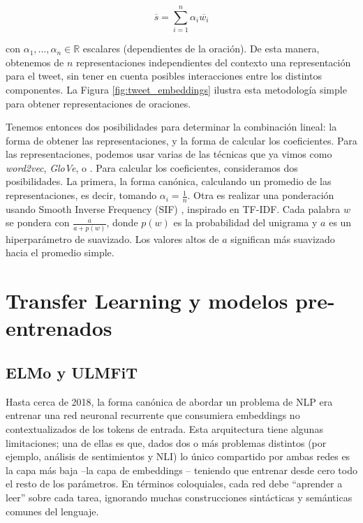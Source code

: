 \begin{equation}
    \overline{s} = \sum\limits_{i=1}^{n} \alpha_i \overline{w_i}
\end{equation}

\noindent con $\alpha_1, \ldots, \alpha_n \in \mathbb{R}$ escalares (dependientes de la oración). De esta manera, obtenemos de $n$ representaciones independientes del contexto una representación para el tweet, sin tener en cuenta posibles interacciones entre los distintos componentes. La Figura \ref{fig:tweet_embeddings} ilustra esta metodología simple para obtener representaciones de oraciones.

Tenemos entonces dos posibilidades para determinar la combinación lineal: la forma de obtener las representaciones, y la forma de calcular los coeficientes. Para las representaciones, podemos usar varias de las técnicas que ya vimos como \emph{word2vec}, \emph{GloVe}, o \fasttext{}. Para calcular los coeficientes, consideramos dos posibilidades. La primera, la forma canónica, calculando un promedio de las representaciones, es decir, tomando $\alpha_i = \frac{1}{n}$. Otra es realizar una ponderación usando Smooth Inverse Frequency (SIF) \cite{arora17}, inspirado en TF-IDF. Cada palabra $ w $ se pondera con $ \frac {a} {a + p (w)} $, donde $ p (w) $ es la probabilidad del unigrama  y $a$ es un hiperparámetro de suavizado. Los valores altos de $ a $ significan más suavizado hacia el promedio simple.



\section{Transfer Learning y modelos pre-entrenados}

\subsection{ELMo y ULMFiT}
\label{subsec:elmo}

Hasta cerca de 2018, la forma canónica de abordar un problema de NLP era entrenar una red neuronal recurrente que consumiera embeddings no contextualizados de los tokens de entrada. Esta arquitectura tiene algunas limitaciones; una de ellas es que, dados dos o más problemas distintos (por ejemplo, análisis de sentimientos y NLI) lo único compartido por ambas redes es la capa más baja --la capa de embeddings -- teniendo que entrenar desde cero todo el resto de los parámetros. En términos coloquiales, cada red debe ``aprender a leer'' sobre cada tarea, ignorando muchas construcciones sintácticas y semánticas comunes del lenguaje.

